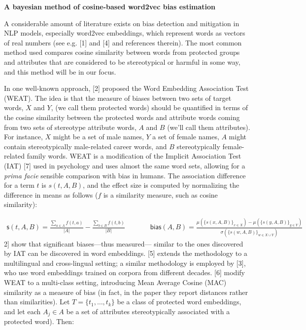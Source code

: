 \documentclass[
  12pt,
  dvipsnames,enabledeprecatedfontcommands]{scrartcl}
\author{}
\date{\vspace{-2.5em}}
\begin{document}
\begin{center}
\Large \textbf{A bayesian method of cosine-based word2vec bias estimation}
\end{center}

\vspace{1mm}

A considerable amount of literature exists on bias detection and
mitigation in NLP models, especially word2vec embeddings, which
represent words as vectors of real numbers (see e.g. {[}1{]} and {[}4{]}
and references therein). The most common method used compares cosine
similarity between words from protected groups and attributes that are
considered to be stereotypical or harmful in some way, and this method
will be in our focus.

In one well-known approach, {[}2{]} proposed the Word Embedding
Association Test (WEAT). The idea is that the measure of biases between
two sets of target words, \(X\) and \(Y\), (we call them protected
words) should be quantified in terms of the cosine similarity between
the protected words and attribute words coming from two sets of
stereotype attribute words, \(A\) and \(B\) (we'll call them
attributes). For instance, \(X\) might be a set of male names, \(Y\) a
set of female names, \(A\) might contain stereotypically male-related
career words, and \(B\) stereotypically female-related family words.
WEAT is a modification of the Implicit Association Test (IAT) {[}7{]}
used in psychology and uses almost the same word sets, allowing for a
\emph{prima facie} sensible comparison with bias in humans. The
association difference for a term \(t\) is \(s(t,A,B)\), and the effect
size is computed by normalizing the difference in means as follows
(\(f\) is a similarity measure, such as cosine similarity):

\vspace{-3mm}

\footnotesize \begin{align}
\mathsf{s}(t,A,B)  = \frac{\sum_{a\in A}f(t,a)}{\vert A\vert} - \frac{\sum_{b\in B}f(t,b)}{\vert B\vert}
& \,\,\,\,\,\,\,\,\,\,\,\,\,\,\,\,\,
\mathsf{bias}(A,B)  = \frac{
\mu(\{s(x,A,B)\}_{x\in X}) -\mu(\{s(y,A,B)\}_{y\in Y}) 
}{
\sigma(\{s(w,A,B)\}_{w\in X\cup Y})
} \tag{WEAT}
\end{align} \normalsize \noindent {[}2{]} show that significant
biases---thus measured--- similar to the ones discovered by IAT can be
discovered in word embeddings. {[}5{]} extends the methodology to a
multilingual and cross-lingual setting; a similar methodology is
employed by {[}3{]}, who use word embeddings trained on corpora from
different decades. {[}6{]} modify WEAT to a multi-class setting,
introducing Mean Average Cosine (MAC) similarity as a measure of bias
(in fact, in the paper they report distances rather than similarities).
Let \(T = \{t_1, \dots, t_k\}\) be a class of protected word embeddings,
and let each \(A_j\in A\) be a set of attributes stereotypically
associated with a protected word). Then:
\end{document}
